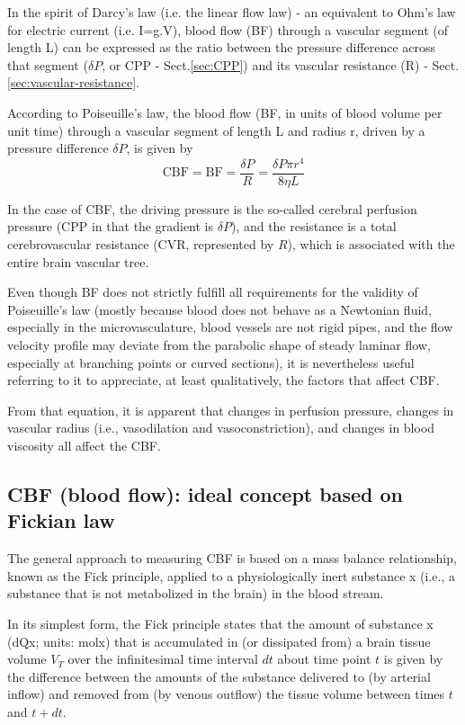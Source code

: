 In the spirit of Darcy's law (i.e. the linear flow law) - an equivalent to Ohm's
law for electric current (i.e. I=g.V), blood flow (BF) through a vascular
segment (of length L) can be expressed as the ratio between the pressure
difference across that segment ($\delta P$, or CPP - Sect.\ref{sec:CPP}) and its
vascular resistance (R) - Sect.\ref{sec:vascular-resistance}. 


According to Poiseuille's law, the blood flow (BF, in units of blood volume per
unit time) through a vascular segment of length L and radius r, driven by a
pressure difference $\delta P$, is given by
\begin{equation}
\text{CBF} = \text{BF} = \frac{\delta P}{R} = \frac{\delta P \pi r^4}{8 \eta L}
\end{equation}

In the case of CBF, the driving pressure is the so-called cerebral perfusion
pressure (CPP in that the gradient is $\delta P$), and the resistance is a total
cerebrovascular resistance (CVR, represented by $R$), which is associated with
the entire brain vascular tree.

Even though BF does not strictly fulfill all requirements for the validity of
Poiseuille's law (mostly because blood does not behave as a Newtonian fluid,
especially in the microvasculature, blood vessels are not rigid pipes, and the
flow velocity profile may deviate from the parabolic shape of steady laminar
flow, especially at branching points or curved sections), it is nevertheless
useful referring to it to appreciate, at least qualitatively, the factors that
affect CBF.

From that equation, it is apparent that changes in perfusion pressure, changes
in vascular radius (i.e., vasodilation and vasoconstriction), and changes in
blood viscosity all affect the CBF.

\subsection{CBF (blood flow): ideal concept based on Fickian law}

The general approach to measuring CBF is based on a mass balance relationship,
known as the Fick principle, applied to a physiologically inert substance x
(i.e., a substance that is not metabolized in the brain) in the blood stream. 

In its simplest form, the Fick principle states that the amount of substance x
(dQx; units: molx) that is accumulated in (or dissipated from) a brain tissue
volume $V_T$ over the infinitesimal time interval $dt$ about time point $t$ is
given by the difference between the amounts of the substance delivered to (by
arterial inflow) and removed from (by venous outflow) the tissue volume between
times $t$ and $t + dt$.

